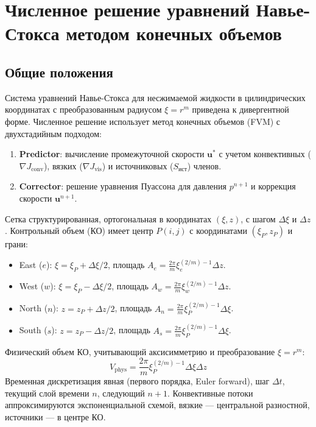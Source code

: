 \documentclass[a4paper,12pt]{article}
\begin{document}
\section*{Численное решение уравнений Навье-Стокса методом конечных объемов}

\subsection*{Общие положения}
Система уравнений Навье-Стокса для несжимаемой жидкости в цилиндрических координатах с преобразованным радиусом \(\xi = r^m\) приведена к дивергентной форме. Численное решение использует метод конечных объемов (FVM) с двухстадийным подходом:
\begin{enumerate}
    \item \textbf{Predictor}: вычисление промежуточной скорости \(\mathbf{u}^*\) с учетом конвективных (\(\nabla J_{\text{conv}}\)), вязких (\(\nabla J_{\text{vis}}\)) и источниковых (\(S_{\text{ист}}\)) членов.
    \item \textbf{Corrector}: решение уравнения Пуассона для давления \(p^{n+1}\) и коррекция скорости \(\mathbf{u}^{n+1}\).
\end{enumerate}

Сетка структурированная, ортогональная в координатах \((\xi, z)\), с шагом \(\Delta \xi\) и \(\Delta z\). Контрольный объем (КО) имеет центр \(P(i,j)\) с координатами \((\xi_P, z_P)\) и грани:
\begin{itemize}
    \item East (\(e\)): \(\xi = \xi_P + \Delta \xi / 2\), площадь \(A_e = \frac{2\pi}{m} \xi_e^{(2/m) - 1} \Delta z\).
    \item West (\(w\)): \(\xi = \xi_P - \Delta \xi / 2\), площадь \(A_w = \frac{2\pi}{m} \xi_w^{(2/m) - 1} \Delta z\).
    \item North (\(n\)): \(z = z_P + \Delta z / 2\), площадь \(A_n = \frac{2\pi}{m} \xi_P^{(2/m) - 1} \Delta \xi\).
    \item South (\(s\)): \(z = z_P - \Delta z / 2\), площадь \(A_s = \frac{2\pi}{m} \xi_P^{(2/m) - 1} \Delta \xi\).
\end{itemize}

Физический объем КО, учитывающий аксисимметрию и преобразование \(\xi = r^m\):
\[
V_{\text{phys}} = \frac{2\pi}{m} \xi_P^{(2/m) - 1} \Delta \xi \Delta z
\]
Временная дискретизация явная (первого порядка, Euler forward), шаг \(\Delta t\), текущий слой времени \(n\), следующий \(n+1\). Конвективные потоки аппроксимируются экспоненциальной схемой, вязкие — центральной разностной, источники — в центре КО.
\end{document}

